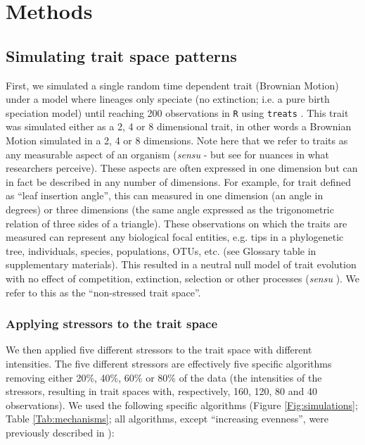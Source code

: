 \documentclass[12pt,letterpaper]{article}
\begin{document}
\section{Methods}
\subsection{Simulating trait space patterns}

First, we simulated a single random time dependent trait (Brownian Motion) under a model where lineages only speciate (no extinction; i.e. a pure birth speciation model) until reaching 200 observations in \texttt{R} \citep{rcore} using \texttt{treats} \citep{guillerme2024treats}.
This trait was simulated either as a 2, 4 or 8 dimensional trait, in other words a Brownian Motion simulated in a 2, 4 or 8 dimensions.
Note here that we refer to traits as any measurable aspect of an organism (\textit{sensu} \cite{mcgill2006rebuilding} - but see \cite{dawson2021traits} for nuances in what researchers perceive).
These aspects are often expressed in one dimension but can in fact be described in any number of dimensions.
For example, for trait defined as ``leaf insertion angle'', this can measured in one dimension (an angle in degrees) or three dimensions (the same angle expressed as the trigonometric relation of three sides of a triangle).
These observations on which the traits are measured can represent any biological focal entities, e.g. tips in a phylogenetic tree, individuals, species, populations, OTUs, etc. (see Glossary table in supplementary materials).
This resulted in a neutral null model of trait evolution with no effect of competition, extinction, selection or other processes (\textit{sensu} \citealt{bausman2018modeling}).
We refer to this as the ``non-stressed trait space''.

\subsubsection{Applying stressors to the trait space}

We then applied five different stressors to the trait space with different intensities.
The five different stressors are effectively five specific algorithms removing either 20\%, 40\%, 60\% or 80\% of the data (the intensities of the stressors, resulting in trait spaces with, respectively, 160, 120, 80 and 40 observations).
We used the following specific algorithms (Figure \ref{Fig:simulations}; Table \ref{Tab:mechanisms}; all algorithms, except ``increasing evenness'', were previously described in \cite{guillerme2020shifting}):
\end{document}

